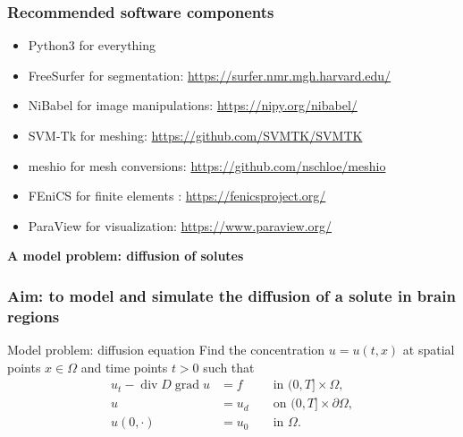 \documentclass[mathserif, aspectratio=169]{beamer}
\DeclareMathOperator{\Div}{\mathrm{div}}
\DeclareMathOperator{\Grad}{\mathrm{grad}}
\newcommand{\mysection}[1]{\begin{frame} \begin{center} \vspace{3em} \textbf{#1} \end{center} \end{frame}}
\begin{document}
\begin{frame}
\frametitle{Recommended software components}

\begin{itemize}
\item
  Python3 for everything
\item
  FreeSurfer for segmentation: \href{https://surfer.nmr.mgh.harvard.edu/}{https://surfer.nmr.mgh.harvard.edu/}
\item
  NiBabel for image manipulations: \href{https://nipy.org/nibabel/}{https://nipy.org/nibabel/}
\item
  SVM-Tk for meshing: \href{https://github.com/SVMTK/SVMTK}{https://github.com/SVMTK/SVMTK}
\item
  meshio for mesh conversions: \href{https://github.com/nschloe/meshio}{https://github.com/nschloe/meshio}
\item
  FEniCS for finite elements : \href{https://fenicsproject.org/}{https://fenicsproject.org/}
\item
  ParaView for visualization: \href{https://www.paraview.org/}{https://www.paraview.org/}
\end{itemize}

\end{frame}

%
% 
%

\mysection{A model problem: diffusion of solutes}

\begin{frame}
  \frametitle{Aim: to model and simulate the diffusion of a solute in brain regions}
  \vspace{-5em}
  \begin{block}{Model problem: diffusion equation}
    Find the concentration $u = u(t, x)$ at spatial points $x \in
    \Omega$ and time points $t > 0$ such that
    \begin{subequations}
      \label{eq:diffusion}
      \begin{align}
        \label{eq:diffusion:a}
        u_t - \Div D \Grad u &= f &&\text{ in } (0, T] \times \Omega, \\
          \label{eq:diffusion:b}
          u &= u_d && \text{ on } (0, T] \times \partial \Omega, \\
            \label{eq:diffusion:c}
            u(0, \cdot) &= u_0 && \text{ in } \Omega.
      \end{align}
    \end{subequations}
  \end{block}

\end{frame}
\end{document}
